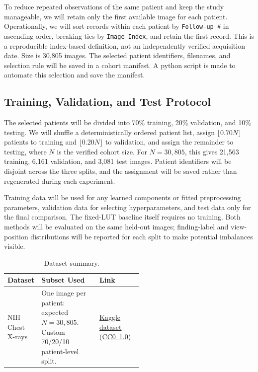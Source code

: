 \documentclass[11pt]{article}
\begin{document}
To reduce repeated observations of the same patient and keep the study
manageable, we will retain only the first available image for each
patient. Operationally, we will sort records within each patient by
\texttt{Follow-up \#} in ascending order, breaking ties by
\texttt{Image Index}, and retain the first record. This is a reproducible
index-based definition, not an independently verified acquisition date.
Size is 30,805 images. The selected
patient identifiers, filenames, and selection rule will be saved in a
cohort manifest. A python script is made to automate this selection and save the manifest.

\subsection{Training, Validation, and Test Protocol}

The selected patients will be divided into 70\% training, 20\% validation,
and 10\% testing. We will shuffle a
deterministically ordered patient list, assign
$\lfloor 0.70N \rfloor$ patients to training and
$\lfloor 0.20N \rfloor$ to validation, and assign the remainder to
testing, where $N$ is the verified cohort size. For $N=30{,}805$, this
gives 21,563 training, 6,161 validation, and 3,081 test images. Patient
identifiers will be disjoint across the three splits, and the assignment
will be saved rather than regenerated during each experiment.

Training data will be used for any learned components or fitted
preprocessing parameters, validation data for selecting hyperparameters,
and test data only for the final comparison. The fixed-LUT baseline
itself requires no training. Both methods will be evaluated on the same
held-out images; finding-label and view-position distributions will be
reported for each split to make potential imbalances visible.

\begin{table}[htbp]
\centering
\caption{Dataset summary.}
\label{tab:data}

\begin{tabularx}{\textwidth}{
    @{}
    p{0.22\linewidth}
    X
    p{0.32\linewidth}
    @{}
}
\toprule
\textbf{Dataset} &
\textbf{Subset Used} &
\textbf{Link} \\
\midrule

NIH Chest X-rays &
One image per patient: expected $N=30{,}805$.
Custom 70/20/10 patient-level split. &
\href{https://www.kaggle.com/datasets/nih-chest-xrays/data}
{Kaggle dataset (CC0~1.0)} \\

\bottomrule
\end{tabularx}
\end{table}
\end{document}
